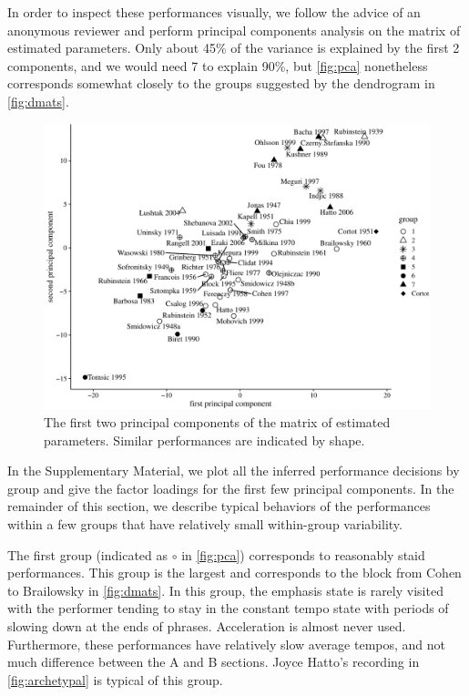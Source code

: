 \documentclass[aoas]{imsart}
\begin{document}
In order to inspect these performances visually, we follow the advice
of an anonymous reviewer and perform principal components analysis on
the matrix of estimated parameters. Only about 45\% of the variance is
explained by the first 2 components, and we would need 7 to explain
90\%, but \autoref{fig:pca} nonetheless corresponds somewhat closely
to the groups suggested by the dendrogram in \autoref{fig:dmats}.
\begin{figure}[t]
  \centering
  \includegraphics[width=\linewidth]{lin-principal-components-1}
  \caption{The first two principal components of the matrix of
    estimated parameters. Similar performances are indicated by
    shape.}
  \label{fig:pca}
\end{figure}
In the Supplementary Material, we plot all the
inferred performance decisions by group and give the
factor loadings for the first few principal components. In the
remainder of this section, we describe
typical behaviors of the performances within a few groups that have relatively small
within-group variability.

The first group (indicated as $\circ$ in \autoref{fig:pca}) corresponds to
reasonably staid performances. This group is the largest and
corresponds to the block from Cohen to Brailowsky in
\autoref{fig:dmats}. In this group, the emphasis state is rarely visited
with the performer tending to stay in the constant tempo state with
periods of slowing down at the ends of phrases. Acceleration is almost never used. Furthermore, these
performances have relatively slow average tempos, and not much
difference between the A and B sections. Joyce Hatto's recording
in \autoref{fig:archetypal} is typical of this group.
\end{document}
